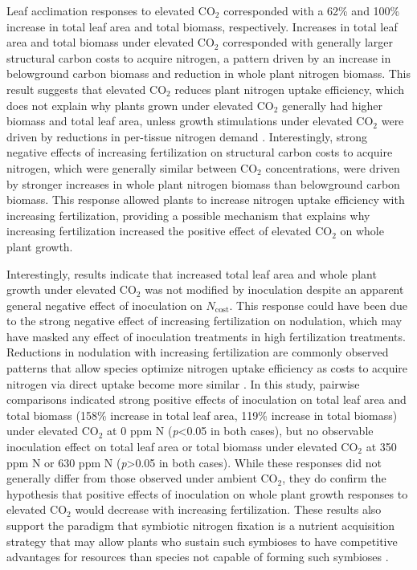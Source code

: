Leaf acclimation responses to elevated CO$_2$ corresponded with a 62\% and 100\% increase in total leaf area and total biomass, respectively. Increases in total leaf area and total biomass under elevated CO$_2$ corresponded with generally larger structural carbon costs to acquire nitrogen, a pattern driven by an increase in belowground carbon biomass and reduction in whole plant nitrogen biomass. This result suggests that elevated CO$_2$ reduces plant nitrogen uptake efficiency, which does not explain why plants grown under elevated CO$_2$ generally had higher biomass and total leaf area, unless growth stimulations under elevated CO$_2$ were driven by reductions in per-tissue nitrogen demand . Interestingly, strong negative effects of increasing fertilization on structural carbon costs to acquire nitrogen, which were generally similar between CO$_2$ concentrations, were driven by stronger increases in whole plant nitrogen biomass than belowground carbon biomass. This response allowed plants to increase nitrogen uptake efficiency with increasing fertilization, providing a possible mechanism that explains why increasing fertilization increased the positive effect of elevated CO$_2$ on whole plant growth.

Interestingly, results indicate that increased total leaf area and whole plant growth under elevated CO$_2$ was not modified by inoculation despite an apparent general negative effect of inoculation on $N_\mathrm{cost}$. This response could have been due to the strong negative effect of increasing fertilization on nodulation, which may have masked any effect of inoculation treatments in high fertilization treatments. Reductions in nodulation with increasing fertilization are commonly observed patterns that allow species optimize nitrogen uptake efficiency as costs to acquire nitrogen via direct uptake become more similar . In this study, pairwise comparisons indicated strong positive effects of inoculation on total leaf area and total biomass (158\% increase in total leaf area, 119\% increase in total biomass) under elevated CO$_2$ at 0 ppm N (\textit{p}<0.05 in both cases), but no observable inoculation effect on total leaf area or total biomass under elevated CO$_2$ at 350 ppm N or 630 ppm N (\textit{p}>0.05 in both cases). While these responses did not generally differ from those observed under ambient CO$_2$, they do confirm the hypothesis that positive effects of inoculation on whole plant growth responses to elevated CO$_2$ would decrease with increasing fertilization. These results also support the paradigm that symbiotic nitrogen fixation is a nutrient acquisition strategy that may allow plants who sustain such symbioses to have competitive advantages for resources than species not capable of forming such symbioses .

